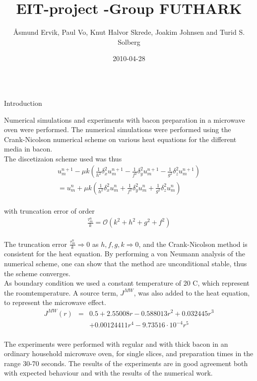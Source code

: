 \documentclass[final,hyperref={pdfpagelabels=false}]{beamer}
\title[NTNU-poster]{EIT-project -Group FUTHARK}
\author[Ervik et al.]{\AA smund Ervik, Paul Vo, Knut Halvor Skrede, Joakim Johnsen and Turid S. Solberg}
\institute[mia, NTNU]{MiA: Mathematics in Applications, Experts in Teamwork (Spring 2011), NTNU}
\date{2010-04-28}
\begin{document}
  \begin{frame}
  \begin{columns}[t]
  \begin{column}{.97\textwidth}

	\justifying

    \begin{multicols}{2}
	{\Large Introduction}

	Numerical simulations and experiments with bacon preparation
	in a microwave oven were performed. The numerical simulations were
	performed using the Crank-Nicolson numerical scheme on various heat
	equations for the different media in bacon. 
\\
The discetizaion scheme used was thus
\\
\begin{eqnarray*}
u_m^{n+1}-\mu k(\frac{1}{h^2}\delta_x^2 u_m^{n+1}-\frac{1}{f^2}\delta_y^2 u_m^{n+1}-\frac{1}{g^2}\delta_z^2 u_m^{n+1}) \\
=u_m^n + \mu k(\frac{1}{h^2}\delta_x^2 u_m^n + \frac{1}{f^2}\delta_y^2 u_m^n +\frac{1}{g^2}\delta_z^2 u_m^n)
\label{crank}
\end{eqnarray*}
\\
with truncation error of order
\begin{eqnarray*}
\frac{\tau_m^ n}{k} = \mathcal{O} (k^2 + h^2 + g^2 + f^2)
\label{truncerror}
\end{eqnarray*}
\\
The truncation error $\frac{\tau_m^n}{k} \Rightarrow 0$ as $h,f,g,k \Rightarrow 0$, and the Crank-Nicolson method is consistent for the heat equation. By performing a von Neumann analysis of the numerical scheme, one can show that the method are unconditional stable, thus the scheme converges.
\\
As boundary condition we used a constant temperature of 20 \textdegree C, which represent the roomtemperature. A source term, $J^{MW}$, was also added to the heat equation, to represent the microwave effect.
\\
\begin{eqnarray*}
  J^{MW}(r) &=& 0.5 + 2.55008r - 0.588013r^2 + 0.032445r^3 \\
    && + 0.00124411r^4 - 9.73516\cdot 10^{-4}r^5
  \label{eq:effektfordeling}
\end{eqnarray*}
\\
The experiments were
	performed with regular and with thick bacon in an ordinary household
	microwave oven, for single slices, and preparation times in the range
	30-70 seconds. The results of the experiments are in good agreement both
	with expected behaviour and with the results of the numerical work.
	

\end{multicols}
\end{column}
\end{columns}
\end{frame}
\end{document}
